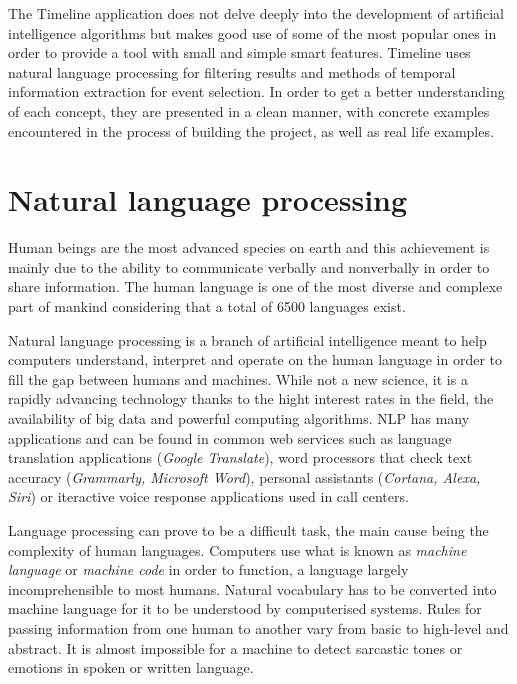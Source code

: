 \documentclass{report}
\begin{document}
The Timeline application does not delve deeply into the development of artificial intelligence algorithms but makes good use of some of the most popular ones in order to provide a tool with small and simple smart features. Timeline uses natural language processing for filtering results and methods of temporal information extraction for event selection. In order to get a better understanding of each concept, they are presented in a clean manner, with concrete examples encountered in the process of building the project, as well as real life examples.

\section{Natural language processing}
Human beings are the most advanced species on earth and this achievement is mainly due to the ability to communicate verbally and nonverbally in order to share information. The human language is one of the most diverse and complexe part of mankind considering that a total of 6500 languages exist.\par

Natural language processing is a branch of artificial intelligence meant to help computers understand, interpret and operate on the human language in order to fill the gap between humans and machines. While not a new science, it is a rapidly advancing technology thanks to the hight interest rates in the field, the availability of big data and powerful computing algorithms. NLP has many applications and can be found in common web services such as language translation applications (\textit{Google Translate}), word processors that check text accuracy (\textit{Grammarly, Microsoft Word}), personal assistants (\textit{Cortana, Alexa, Siri}) or iteractive voice response applications used in call centers. \par

Language processing can prove to be a difficult task, the main cause being the complexity of human languages. Computers use what is known as \textit{machine language} or \textit{machine code} in order to function, a language largely incomprehensible to most humans. Natural vocabulary has to be converted into machine language for it to be understood by computerised systems. Rules for passing information from one human to another vary from basic to high-level and abstract. It is almost impossible for a machine to detect sarcastic tones or emotions in spoken or written language. \par
\end{document}
